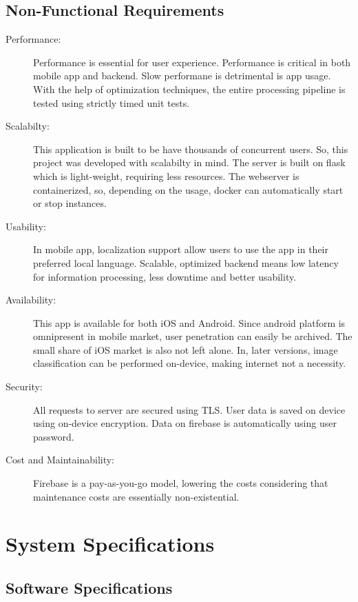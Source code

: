 \documentclass[../Report.tex]{subfiles}
\begin{document}
\subsection{Non-Functional Requirements}
\begin{description}
  \item[Performance: ] Performance is essential for user experience. Performance is critical in both mobile app and backend. Slow performane 
  is detrimental is app usage. With the help of optimization techniques, the entire processing pipeline is tested using strictly timed 
  unit tests.
  
  \item[Scalabilty: ] This application is built to be have thousands of concurrent users. So, this project was developed with scalabilty in 
  mind. The server is built on flask which is light-weight, requiring less resources. The webserver is containerized, so, depending on the 
  usage, docker can automatically start or stop instances.

  \item[Usability: ] In mobile app, localization support allow users to use the app in their preferred local language. Scalable, optimized 
  backend means low latency for information processing, less downtime and better usability.

  \item[Availability: ] This app is available for both iOS and Android. Since android platform is omnipresent in mobile market, user 
  penetration can easily be archived. The small share of iOS market is also not left alone. In, later versions, image classification
  can be performed on-device, making internet not a necessity.

  \item[Security: ] All requests to server are secured using TLS. User data is saved on device using on-device encryption. Data on 
  firebase is automatically using user password.

  \item[Cost and Maintainability: ] Firebase is a pay-as-you-go model, lowering the costs considering that maintenance costs are 
  essentially non-existential.
\end{description} 

\section{System Specifications}

\subsection{Software Specifications}
\end{document}
